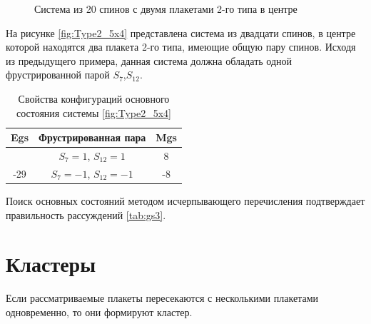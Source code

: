 \documentclass[utf8, babel, sor, jor, amsmath, amssymb, reprint]{elsarticle} %
\begin{document}
\begin{figure}[H]
	\centering
	\caption{Система из 20 спинов с двумя плакетами 2-го типа в центре}
	\label{fig:Type2_5x4}
\end{figure}

На рисунке \eqref{fig:Type2_5x4} представлена система из двадцати спинов, в центре которой находятся два плакета 2-го типа, имеющие общую пару спинов. Исходя из предыдущего примера, данная система должна обладать одной фрустрированной парой  $S_7$,$S_12$.

\begin{table}[H]
	\centering
	\begin{tabular}{|c|c|c|}
		\hline
		Egs   &   Фрустрированная пара & Mgs\\
		\hline
		 &  $S_7=1$, $S_{12}=1$ & 8 \\
	\cline{2-3}
		-29	\multirow{3}{*}{}
		  &   $S_7=-1$, $S_{12}=-1$ & -8 \\
		\hline
	\end{tabular}
	\caption{Свойства конфигураций основного состояния системы \eqref{fig:Type2_5x4}}
	\label{tab:gs3}
\end{table}

Поиск основных состояний методом исчерпывающего перечисления подтверждает правильность рассуждений \eqref{tab:gs3}.

\section{Кластеры}

Если рассматриваемые плакеты пересекаются с несколькими плакетами одновременно, то они формируют кластер.
\end{document}
